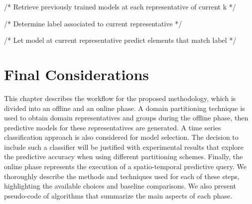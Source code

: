 \begin{algorithm}[h!]
\begin{algorithmic}[1]
        /* Retrieve previously trained models at each representative of current k */

        
            /* Determine label associated to current representative */
            
            /* Let model at current representative predict elements that match label */
        \EndFor

    \EndFor
\EndIf

\EndFunction 
\end{algorithmic} 
\end{algorithm}

\section{Final Considerations}
\label{Sec:MethodologySummary}

This chapter describes the workflow for the proposed methodology, which is divided into an offline and an online phase. A domain partitioning technique is used to obtain domain representatives and groups during the offline phase, then predictive models for these representatives are generated. A time series classification approach is also considered for model selection. The decision to include such a classifier will be justified with experimental results that explore the predictive accuracy when using different partitioning schemes. Finally, the online phase represents the execution of a spatio-temporal predictive query. We thoroughly describe the methods and techniques used for each of these steps, highlighting the available choices and baseline comparisons. We also present pseudo-code of algorithms that summarize the main aspects of each phase.